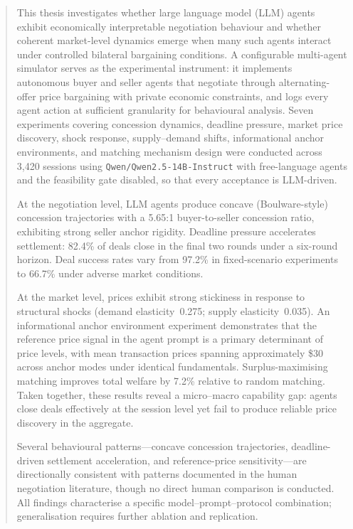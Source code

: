 \begin{abstract}
This thesis investigates whether large language model (LLM) agents exhibit economically interpretable negotiation behaviour and whether coherent market-level dynamics emerge when many such agents interact under controlled bilateral bargaining conditions.  A configurable multi-agent simulator serves as the experimental instrument: it implements autonomous buyer and seller agents that negotiate through alternating-offer price bargaining with private economic constraints, and logs every agent action at sufficient granularity for behavioural analysis.  Seven experiments covering concession dynamics, deadline pressure, market price discovery, shock response, supply--demand shifts, informational anchor environments, and matching mechanism design were conducted across 3,420 sessions using \texttt{Qwen/Qwen2.5-14B-Instruct} with free-language agents and the feasibility gate disabled, so that every acceptance is LLM-driven.

At the negotiation level, LLM agents produce concave (Boulware-style) concession trajectories with a 5.65:1 buyer-to-seller concession ratio, exhibiting strong seller anchor rigidity.  Deadline pressure accelerates settlement: 82.4\% of deals close in the final two rounds under a six-round horizon.  Deal success rates vary from 97.2\% in fixed-scenario experiments to 66.7\% under adverse market conditions.

At the market level, prices exhibit strong stickiness in response to structural shocks (demand elasticity~0.275; supply elasticity~0.035).  An informational anchor environment experiment demonstrates that the reference price signal in the agent prompt is a primary determinant of price levels, with mean transaction prices spanning approximately \$30 across anchor modes under identical fundamentals.  Surplus-maximising matching improves total welfare by 7.2\% relative to random matching.  Taken together, these results reveal a micro--macro capability gap: agents close deals effectively at the session level yet fail to produce reliable price discovery in the aggregate.

Several behavioural patterns---concave concession trajectories, deadline-driven settlement acceleration, and reference-price sensitivity---are directionally consistent with patterns documented in the human negotiation literature, though no direct human comparison is conducted.  All findings characterise a specific model--prompt--protocol combination; generalisation requires further ablation and replication.

\end{abstract}
